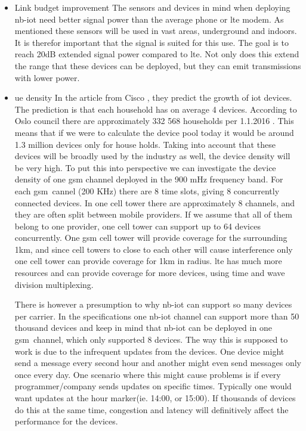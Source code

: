 \documentclass[USenglish]{ifimaster}  %
\begin{document}
\begin{itemize}
  \item Link budget improvement \newline
  The sensors and devices in mind when deploying \acrshort{nb-iot} need better signal power than the average phone or \acrshort{lte} modem. As mentioned these sensors will be used in vast areas, underground and indoors. It is therefor important that the signal is suited for this use. The goal is to reach 20dB extended signal power compared to \acrshort{lte}. Not only does this extend the range that these devices can be deployed, but they can emit transmissions with lower power.

  \item \acrshort{ue} density \newline
  In the article from Cisco \cite{online:IoT2020}, they predict the growth of \acrshort{iot} devices. The prediction is that each household has on average 4 devices. According to Oslo council there are approximately 332 568 households per 1.1.2016 \cite{online:husholdningstatistikk}. This means that if we were to calculate the device pool today it would be around 1.3 million devices only for house holds. Taking into account that these devices will be broadly used by the industry as well, the device density will be very high. To put this into perspective we can investigate the device density of one \acrshort{gsm} channel deployed in the 900 mHz frequency band. For each \acrshort{gsm} cannel (200 KHz) there are 8 time slots, giving 8 concurrently connected devices. In one cell tower there are approximately 8 channels, and they are often split between mobile providers. If we assume that all of them belong to one provider, one cell tower can support up to 64 devices concurrently. One \acrshort{gsm} cell tower will provide coverage for the surrounding 1km, and since cell towers to close to each other will cause interference only one cell tower can provide coverage for 1km in radius. \acrshort{lte} has much more resources and can provide coverage for more devices, using time and wave division multiplexing.

  There is however a presumption to why \acrshort{nb-iot} can support so many devices per carrier. In the specifications one \acrshort{nb-iot} channel can support more than 50 thousand devices and keep in mind that \acrshort{nb-iot} can be deployed in one \acrshort{gsm} channel, which only supported 8 devices. The way this is supposed to work is due to the infrequent updates from the devices. One device might send a message every second hour and another might even send messages only once every day. One scenario where this might cause problems is if every programmer/company sends updates on specific times. Typically one would want updates at the hour marker(ie. 14:00, or 15:00). If thousands of devices do this at the same time, congestion and latency will definitively affect the performance for the devices.


\end{itemize}
\end{document}
